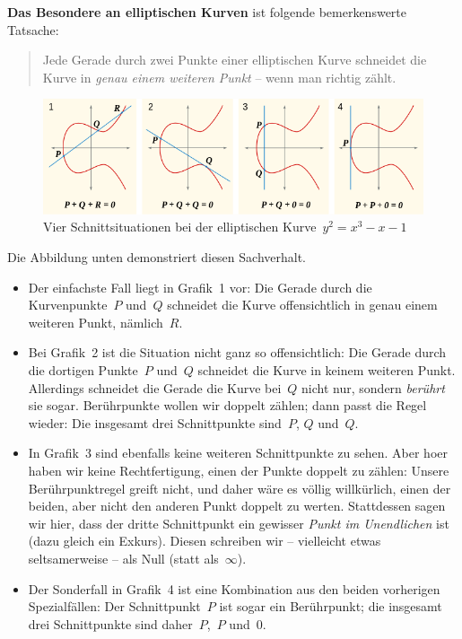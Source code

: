 \documentclass{../zirkelblatt}
\begin{document}
\textbf{Das Besondere an elliptischen Kurven} ist folgende bemerkenswerte Tatsache:
\begin{quote}
Jede Gerade durch zwei Punkte einer elliptischen Kurve schneidet die Kurve in
\emph{genau einem weiteren Punkt} -- wenn man richtig zählt.
\end{quote}
\begin{figure}[b]
  \centering
  \includegraphics[scale=0.6]{elliptic-curve-r}
  \caption{Vier Schnittsituationen bei der elliptischen Kurve~$y^2 = x^3 - x - 1$}
\end{figure}
Die Abbildung unten demonstriert diesen Sachverhalt.
\begin{itemize}
\item Der einfachste Fall liegt
in Grafik~1 vor: Die Gerade durch die Kurvenpunkte~$P$ und~$Q$ schneidet die
Kurve offensichtlich in genau einem weiteren Punkt, nämlich~$R$.
\item Bei Grafik~2
ist die Situation nicht ganz so offensichtlich: Die Gerade durch die dortigen
Punkte~$P$ und~$Q$ schneidet die Kurve in keinem weiteren Punkt. Allerdings
schneidet die Gerade die Kurve bei~$Q$ nicht nur, sondern \emph{berührt} sie
sogar. Berührpunkte wollen wir doppelt zählen; dann passt die Regel wieder: Die
insgesamt drei Schnittpunkte sind~$P$, $Q$ und~$Q$.
\item In Grafik~3 sind ebenfalls keine weiteren Schnittpunkte zu sehen. Aber
hoer haben wir keine Rechtfertigung, einen der Punkte doppelt zu zählen: Unsere
Berührpunktregel greift nicht, und daher wäre es völlig willkürlich, einen der
beiden, aber nicht den anderen Punkt doppelt zu werten. Stattdessen sagen wir hier,
dass der dritte Schnittpunkt ein gewisser \emph{Punkt im Unendlichen} ist (dazu
gleich ein Exkurs).
Diesen schreiben wir -- vielleicht etwas seltsamerweise -- als Null (statt
als~$\infty$).
\item Der Sonderfall in Grafik~4 ist eine Kombination aus den beiden vorherigen
Spezialfällen: Der Schnittpunkt~$P$ ist sogar ein Berührpunkt; die insgesamt
drei Schnittpunkte sind daher~$P$,~$P$ und~$0$.
\end{itemize}
\end{document}
